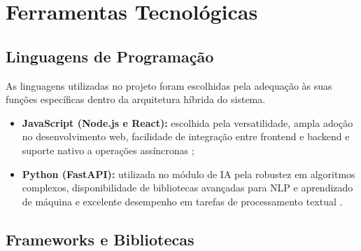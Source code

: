 \section{Ferramentas Tecnológicas}

\subsection{Linguagens de Programação}

As linguagens utilizadas no projeto foram escolhidas pela adequação às suas funções específicas dentro da arquitetura híbrida do sistema.

\begin{itemize}
    \item \textbf{JavaScript (Node.js e React):} escolhida pela versatilidade, ampla adoção no desenvolvimento web, facilidade de integração entre frontend e backend e suporte nativo a operações assíncronas \cite{nodejs_docs_2024, react_docs_2024};
    
    \item \textbf{Python (FastAPI):} utilizada no módulo de IA pela robustez em algoritmos complexos, disponibilidade de bibliotecas avançadas para NLP e aprendizado de máquina e excelente desempenho em tarefas de processamento textual \cite{python_docs_2024, fastapi_docs_2024}.
\end{itemize}


\subsection{Frameworks e Bibliotecas}

